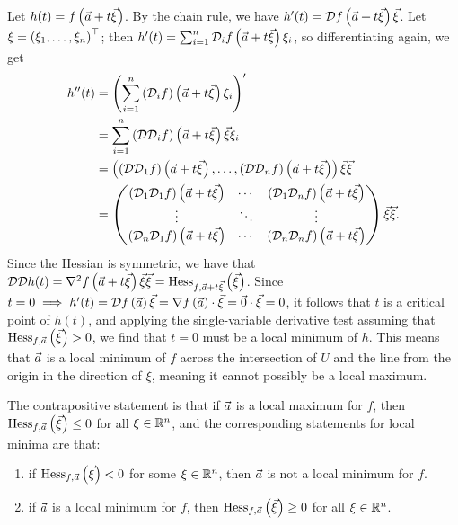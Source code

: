 \documentclass[main.tex]{subfiles}
\begin{document}
\begin{soln}
    Let $h(t) = f\left( \vec{a} + t\vec{\xi} \right)$. By the chain rule, we have $h'(t) = \mathcal{D}f\left( \vec{a} + t\vec{\xi} \right)\vec{\xi}$. Let $\xi = \left( \xi_1, \ldots , \xi_n \right)^\top$; then $h'(t) = \sum_{i = 1}^n \mathcal{D}_i f\left( \vec{a} + t\vec\xi \right)\xi_i$, so differentiating again, we get
    \begin{align*}
        h''(t) &= \left( \sum_{i = 1}^n \left( \mathcal{D}_if \right)\left( \vec{a} + t\vec\xi \right)\xi_i \right)' \\
        &= \sum_{i = 1}^n \left( \mathcal{DD}_if \right)\left( \vec{a} + t\vec\xi \right)\vec\xi\xi_i \\
        &= \left( \left( \mathcal{DD}_1f \right)\left( \vec{a} + t\vec\xi \right), \ldots, \left( \mathcal{DD}_nf \right)\left( \vec{a} + t\vec\xi \right) \right)\vec\xi\vec\xi \\
        &= \begin{pmatrix}
            \left( \mathcal{D}_1\mathcal{D}_1f \right)\left( \vec{a} + t\vec\xi \right) & \cdots & \left( \mathcal{D}_1\mathcal{D}_nf \right)\left( \vec{a} + t\vec\xi \right) \\
            \vdots & \ddots & \vdots \\
            \left( \mathcal{D}_n\mathcal{D}_1f \right)\left( \vec{a} + t\vec\xi \right) & \cdots & \left( \mathcal{D}_n\mathcal{D}_nf \right)\left( \vec{a} + t\vec\xi \right)
        \end{pmatrix}\vec\xi\vec\xi.
    \end{align*}
    Since the Hessian is symmetric, we have that $\mathcal{DD}h(t) = \nabla^2 f\left( \vec{a} + t\vec{\xi} \right)\vec\xi\vec\xi = \operatorname{Hess}_{f, \vec{a} + t\vec\xi}\left( \vec\xi \right)$. Since $t = 0 \implies h'(t) = \mathcal{D}f\left( \vec{a} \right)\vec\xi = \nabla f\left( \vec{a} \right) \cdot \vec\xi = \vec{0} \cdot \vec\xi = 0$, it follows that $t$ is a critical point of $h(t)$, and applying the single-variable derivative test assuming that $\operatorname{Hess}_{f, \vec{a}}\left( \vec\xi \right) > 0$, we find that $t = 0$ must be a local minimum of $h$. This means that $\vec{a}$ is a local minimum of $f$ across the intersection of $U$ and the line from the origin in the direction of $\xi$, meaning it cannot possibly be a local maximum.

    The contrapositive statement is that if $\vec{a}$ is a local maximum for $f$, then $\operatorname{Hess}_{f, \vec{a}}\left( \vec\xi \right) \le 0$ for all $\xi\in \mathbb R^n$, and the corresponding statements for local minima are that:
    \begin{enumerate}
        \item if $\operatorname{Hess}_{f, \vec{a}}\left( \vec\xi \right) < 0$ for some $\xi\in \mathbb R^n$, then $\vec{a}$ is not a local minimum for $f$.
        \item if $\vec{a}$ is a local minimum for $f$, then $\operatorname{Hess}_{f, \vec{a}}\left( \vec\xi \right) \ge 0$ for all $\xi\in \mathbb R^n$.
    \end{enumerate}
\end{soln}
\eject
\end{document}
